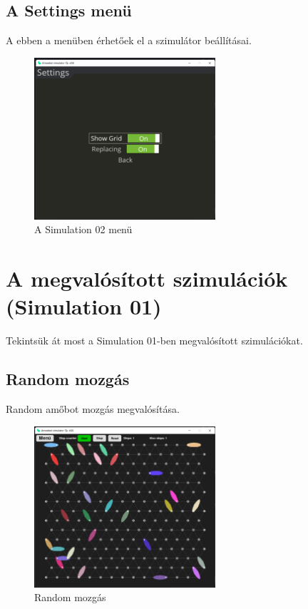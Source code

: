 \documentclass[	
  noindent
]{elteikthesis}[2024/04/26]
\begin{document}
        \subsection{A Settings menü}
        A ebben a menüben érhetőek el a szimulátor beállításai.

        \begin{figure}[H]
          \centering
          \includegraphics[width=0.6\textwidth]{images/simulatons/settings.png}
          \caption{A Simulation 02 menü}
          \label{fig:settings}
        \end{figure}

    \section{A megvalósított szimulációk (Simulation 01)}
        Tekintsük át most a Simulation 01-ben megvalósított szimulációkat.

        \subsection{Random mozgás}
          Random amőbot mozgás megvalósítása.
        \begin{figure}[H]
          \centering
          \includegraphics[width=0.6\textwidth]{images/simulatons/01_random.png}
          \caption{Random mozgás}
          \label{fig:01_random}
        \end{figure}
\end{document}
